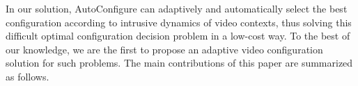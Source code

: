 In our solution, AutoConfigure can adaptively and automatically select the best configuration according to intrusive dynamics of video contexts, thus solving this difficult optimal configuration decision problem in a low-cost way. To the best of our knowledge, we are the first to propose an adaptive video configuration solution for such problems. 
The main contributions of this paper are summarized as follows. 

